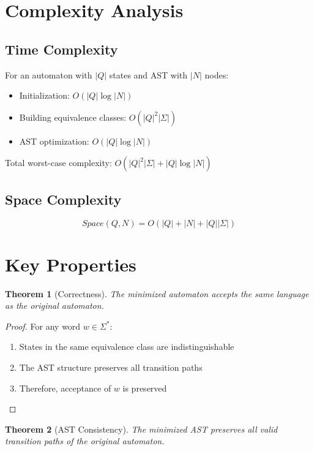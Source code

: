 \documentclass[12pt]{article}
\newtheorem{theorem}{Theorem}
\begin{document}
\section{Complexity Analysis}

\subsection{Time Complexity}
For an automaton with $|Q|$ states and AST with $|N|$ nodes:

\begin{itemize}
\item Initialization: $O(|Q| \log |N|)$
\item Building equivalence classes: $O(|Q|^2|\Sigma|)$
\item AST optimization: $O(|Q|\log |N|)$
\end{itemize}

Total worst-case complexity: $O(|Q|^2|\Sigma| + |Q|\log |N|)$

\subsection{Space Complexity}
\[
Space(Q, N) = O(|Q| + |N| + |Q||\Sigma|)
\]

\section{Key Properties}

\begin{theorem}[Correctness]
The minimized automaton accepts the same language as the original automaton.
\end{theorem}

\begin{proof}
For any word $w \in \Sigma^*$:
\begin{enumerate}
    \item States in the same equivalence class are indistinguishable
    \item The AST structure preserves all transition paths
    \item Therefore, acceptance of $w$ is preserved
\end{enumerate}
\end{proof}

\begin{theorem}[AST Consistency]
The minimized AST preserves all valid transition paths of the original automaton.
\end{theorem}
\end{document}
